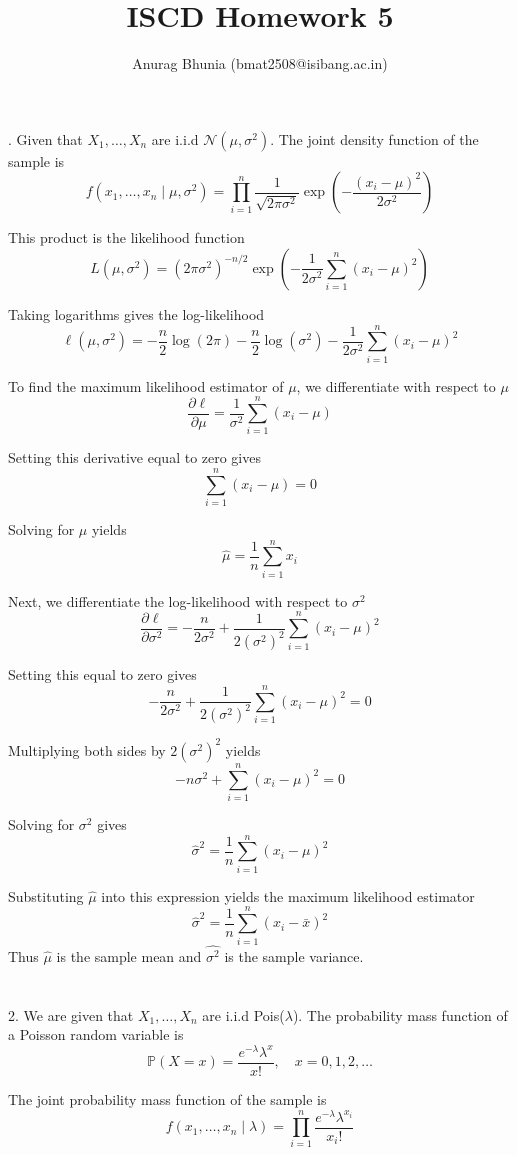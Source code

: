 \documentclass[11pt]{article}\usepackage[]{graphicx}\usepackage[]{xcolor}
\title{ISCD Homework 5}
\author{
\begin{tabular}{c}
Anurag Bhunia (bmat2508@isibang.ac.in)\\[0.6em]
\end{tabular}
}
\date{}
\begin{document}
. Given that $X_1,\dots,X_n$ are i.i.d $\mathcal{N}(\mu,\sigma^2)$.
The joint density function of the sample is
\[
f(x_1,\ldots,x_n \mid \mu,\sigma^2)
= \prod_{i=1}^n \frac{1}{\sqrt{2\pi\sigma^2}}
\exp\!\left(-\frac{(x_i-\mu)^2}{2\sigma^2}\right)
\]

This product is the likelihood function
\[
L(\mu,\sigma^2)
= (2\pi\sigma^2)^{-n/2}
\exp\!\left(-\frac{1}{2\sigma^2}\sum_{i=1}^n (x_i-\mu)^2\right)
\]

Taking logarithms gives the log-likelihood
\[
\ell(\mu,\sigma^2)
= -\frac{n}{2}\log(2\pi)
-\frac{n}{2}\log(\sigma^2)
-\frac{1}{2\sigma^2}\sum_{i=1}^n (x_i-\mu)^2
\]

To find the maximum likelihood estimator of $\mu$, we differentiate with respect to $\mu$
\[
\frac{\partial \ell}{\partial \mu}
= \frac{1}{\sigma^2}\sum_{i=1}^n (x_i-\mu)
\]

Setting this derivative equal to zero gives
\[
\sum_{i=1}^n (x_i-\mu)=0
\]

Solving for $\mu$ yields
\[
\hat{\mu}=\frac{1}{n}\sum_{i=1}^n x_i
\]

Next, we differentiate the log-likelihood with respect to $\sigma^2$
\[
\frac{\partial \ell}{\partial \sigma^2}
= -\frac{n}{2\sigma^2}
+\frac{1}{2(\sigma^2)^2}\sum_{i=1}^n (x_i-\mu)^2
\]

Setting this equal to zero gives
\[
-\frac{n}{2\sigma^2}
+\frac{1}{2(\sigma^2)^2}\sum_{i=1}^n (x_i-\mu)^2=0
\]

Multiplying both sides by $2(\sigma^2)^2$ yields
\[
-n\sigma^2+\sum_{i=1}^n (x_i-\mu)^2=0
\]

Solving for $\sigma^2$ gives
\[
\hat{\sigma}^2=\frac{1}{n}\sum_{i=1}^n (x_i-\mu)^2
\]

Substituting $\hat{\mu}$ into this expression yields the maximum likelihood estimator
\[
\hat{\sigma}^2=\frac{1}{n}\sum_{i=1}^n (x_i-\bar{x})^2
\]
Thus $\hat{\mu}$ is the sample mean and $\hat{\sigma^2}$ is the sample variance.\\ \\ \\
2. We are given that $X_1,\dots,X_n$ are i.i.d Pois($\lambda$).
The probability mass function of a Poisson random variable is
\[
\mathbb{P}(X=x)=\frac{e^{-\lambda}\lambda^x}{x!}, \quad x=0,1,2,\ldots
\]

The joint probability mass function of the sample is
\[
f(x_1,\ldots,x_n \mid \lambda)
= \prod_{i=1}^n \frac{e^{-\lambda}\lambda^{x_i}}{x_i!}
\]
\end{document}
